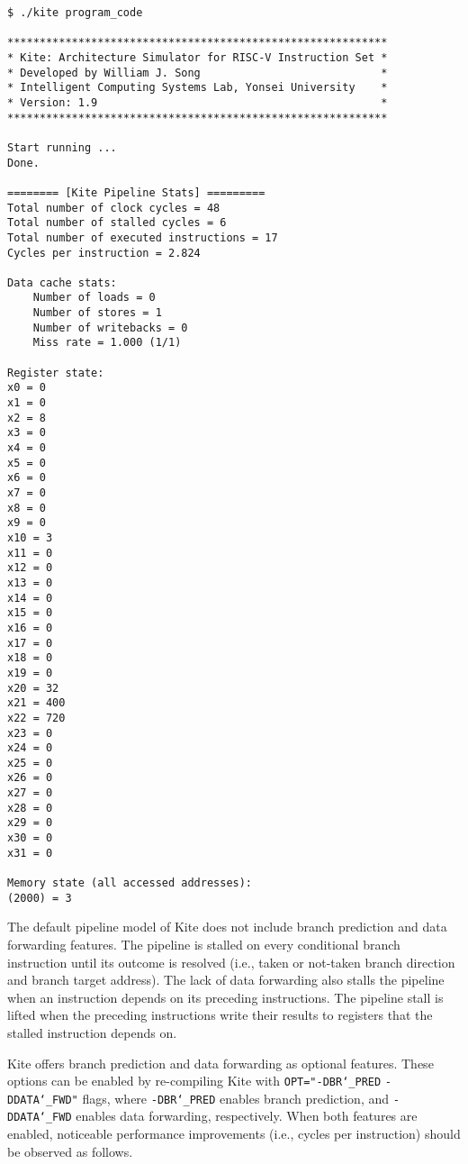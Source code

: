 \documentclass[10pt]{article}
\begin{document}
\begin{Verbatim}[frame=single]
$ ./kite program_code

***********************************************************
* Kite: Architecture Simulator for RISC-V Instruction Set *
* Developed by William J. Song                            *
* Intelligent Computing Systems Lab, Yonsei University    *
* Version: 1.9                                            *
***********************************************************

Start running ...
Done.

======== [Kite Pipeline Stats] =========
Total number of clock cycles = 48
Total number of stalled cycles = 6
Total number of executed instructions = 17
Cycles per instruction = 2.824

Data cache stats:
    Number of loads = 0
    Number of stores = 1
    Number of writebacks = 0
    Miss rate = 1.000 (1/1)

Register state:
x0 = 0
x1 = 0
x2 = 8
x3 = 0
x4 = 0
x5 = 0
x6 = 0
x7 = 0
x8 = 0
x9 = 0
x10 = 3
x11 = 0
x12 = 0
x13 = 0
x14 = 0
x15 = 0
x16 = 0
x17 = 0
x18 = 0
x19 = 0
x20 = 32
x21 = 400
x22 = 720
x23 = 0
x24 = 0
x25 = 0
x26 = 0
x27 = 0
x28 = 0
x29 = 0
x30 = 0
x31 = 0

Memory state (all accessed addresses):
(2000) = 3
\end{Verbatim}

The default pipeline model of Kite does not include branch prediction and data forwarding features.
The pipeline is stalled on every conditional branch instruction until its outcome is resolved (i.e., taken or not-taken branch direction and branch target address).
The lack of data forwarding also stalls the pipeline when an instruction depends on its preceding instructions.
The pipeline stall is lifted when the preceding instructions write their results to registers that the stalled instruction depends on.

Kite offers branch prediction and data forwarding as optional features.
These options can be enabled by re-compiling Kite with {\tt OPT="-DBR\char`_PRED} {\tt -DDATA\char`_FWD"} flags, where {\tt -DBR\char`_PRED} enables branch prediction, and {\tt -DDATA\char`_FWD} enables data forwarding, respectively.
When both features are enabled, noticeable performance improvements (i.e., cycles per instruction) should be observed as follows.
\end{document}
